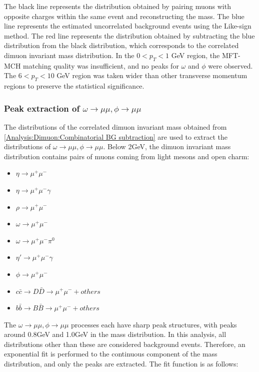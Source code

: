                 The black line represents the distribution obtained by pairing muons with opposite charges within the same event and reconstructing the mass. The blue line represents the estimated uncorrelated background events using the Like-sign method. The red line represents the distribution obtained by subtracting the blue distribution from the black distribution, which corresponds to the correlated dimuon invariant mass distribution. In the $0 < p_T < 1$ GeV region, the MFT-MCH matching quality was insufficient, and no peaks for $\omega$ and $\phi$ were observed. The $6 < p_T < 10$ GeV region was taken wider than other transverse momentum regions to preserve the statistical significance.
        
            \subsubsection{Peak extraction of $\omega \rightarrow \mu\mu ,\phi \rightarrow \mu\mu$}
            \label{Peak_extraction}
                The distributions of the correlated dimuon invariant mass obtained from \ref{Analysis:Dimuon:Combinatorial BG subtraction} are used to extract the distributions of $\omega \rightarrow \mu\mu,\phi \rightarrow \mu\mu$. Below 2GeV, the dimuon invariant mass distribution contains pairs of muons coming from light mesons and open charm:
                \begin{itemize}
                    \item $\eta \rightarrow \mu^+ \mu^-$
                    \item $\eta \rightarrow \mu^+ \mu^- \gamma$
                    \item $\rho \rightarrow \mu^+ \mu^-$
                    \item $\omega \rightarrow \mu^+ \mu^-$
                    \item $\omega \rightarrow \mu^+ \mu^- \pi^0$
                    \item $\eta' \rightarrow \mu^+ \mu^- \gamma$
                    \item $\phi \rightarrow \mu^+ \mu^-$
                    \item $c\bar{c} \rightarrow D\bar{D} \rightarrow \mu^+ \mu^- + others$
                    \item $b\bar{b} \rightarrow B\bar{B} \rightarrow \mu^+ \mu^- + others$
                \end{itemize}
                The $\omega \rightarrow \mu\mu,\phi \rightarrow \mu\mu$ processes each have sharp peak structures, with peaks around 0.8GeV and 1.0GeV in the mass distribution. In this analysis, all distributions other than these are considered background events. Therefore, an exponential fit is performed to the continuous component of the mass distribution, and only the peaks are extracted. The fit function is as follows:
